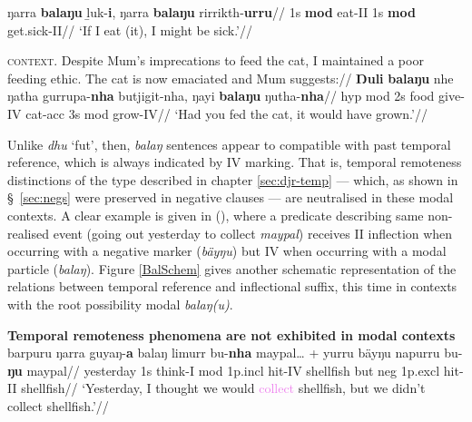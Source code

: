 \a\begingl\gla ŋarra \textbf{balaŋu} ḻuk-\textbf{i}, ŋarra \textbf{balaŋu} rirrikth-\textbf{urru}//
\glb 1s \textbf{\gls{mod}} eat-\gls{II} 1s \textbf{\gls{mod}} get.sick-\gls{II}//
\glft`If I eat (it), I might be sick.'//\endgl

\a\begingl\glpreamble \textsc{context.} Despite Mum's imprecations to feed the cat, I maintained a poor feeding ethic. The cat is now emaciated and Mum suggests://
\gla \textbf{Ŋuli} \textbf{balaŋu} nhe ŋatha gurrupa-\textbf{nha} butjigit-nha, ŋayi \textbf{balaŋu} ŋutha-\textbf{nha}//
\glb \gls{hyp} \gls{mod} 2s food give-\gls{IV} cat-\gls{acc} 3s \gls{mod} grow-\gls{IV}//
\glft`Had you fed the cat, it would have grown.'\trailingcitation{[DhG~20190405]}//\endgl

\xe


Unlike \textit{dhu} `\gls{fut}', then, \textit{balaŋ} sentences appear to compatible with past temporal reference, which is always indicated by \gls{IV} marking. That is, temporal remoteness distinctions of the type described in chapter \ref{sec:djr-temp} --- which, as shown in \S~\ref{sec:negs} were preserved in negative clauses --- are neutralised in these modal contexts. A clear example is given in (\nextx), where a predicate describing same non-realised event (going out \textsf{yesterday} to collect \textit{maypal}) receives \gls{II} inflection when occurring with a negative marker (\textit{bäyŋu}) but \gls{IV} when occurring with a modal particle (\textit{balaŋ}). Figure \ref{BalSchem} gives another schematic representation of the relations between temporal reference and inflectional suffix, this time in contexts with the root possibility modal \textit{balaŋ(u)}.



\pex\textbf{Temporal remoteness phenomena are not exhibited in modal contexts}\label{MODvNEG}
\begingl\gla barpuru ŋarra guyaŋ-\textbf{a} balaŋ limurr bu-\textbf{nha} maypal… + yurru bäyŋu napurru bu-\textbf{ŋu} maypal//
\glb yesterday 1s think-\gls{I} \gls{mod} 1p.\gls{incl} hit-\gls{IV} shellfish but \gls{neg} 1p.\gls{excl} hit-\gls{II} shellfish//
\glft`Yesterday, I \textcolor{forest}{thought} we would \textcolor{violet}{collect} shellfish, but we didn't \textcolor{ochre}{collect} shellfish.'\trailingcitation{[AW~20190429]}//\endgl\xe


